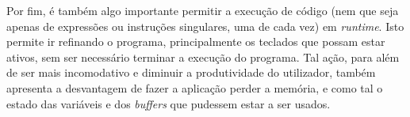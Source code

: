Por fim, é também algo importante permitir a execução de código (nem que seja apenas de expressões ou instruções singulares, uma de cada vez) em \textit{runtime}. Isto permite ir refinando o programa, principalmente os teclados que possam estar ativos, sem ser necessário terminar a execução do programa. Tal ação, para além de ser mais incomodativo e diminuir a produtividade do utilizador, também apresenta a desvantagem de fazer a aplicação perder a memória, e como tal o estado das variáveis e dos \textit{buffers} que pudessem estar a ser usados.
